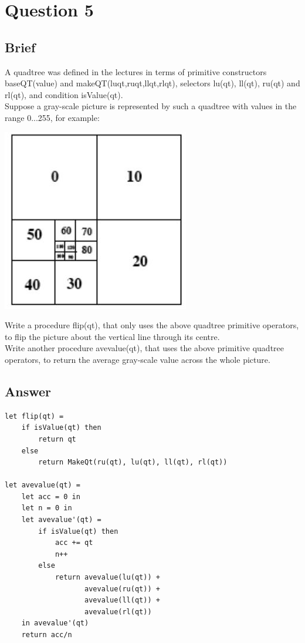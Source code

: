 \documentclass{article}
\begin{document}
\section{Question 5}
\subsection{Brief}
A quadtree was defined in the lectures in terms of primitive constructors baseQT(value) and makeQT(luqt,ruqt,llqt,rlqt), selectors lu(qt), ll(qt), ru(qt) and rl(qt), and condition isValue(qt). 
\\ \newline
Suppose a gray-scale picture is represented by such a quadtree with values in the range 0...255, for example:
\\ \newline
\begin{center}\includegraphics[scale=0.60]{DSAE1Quadtree.png}\end{center}
Write a procedure flip(qt), that only uses the above quadtree primitive operators, to flip the picture about the vertical line through its centre.
\\ \newline
Write another procedure avevalue(qt), that uses the above primitive quadtree operators, to return the average gray-scale value across the whole picture.
\subsection{Answer}
\begin{lstlisting}
let flip(qt) =
    if isValue(qt) then
        return qt
    else
        return MakeQt(ru(qt), lu(qt), ll(qt), rl(qt))
        
let avevalue(qt) =
    let acc = 0 in
    let n = 0 in
    let avevalue'(qt) = 
        if isValue(qt) then
            acc += qt
            n++
        else
            return avevalue(lu(qt)) +
                   avevalue(ru(qt)) +
                   avevalue(ll(qt)) +
                   avevalue(rl(qt))
    in avevalue'(qt) 
    return acc/n
     
\end{lstlisting}
\end{document}
